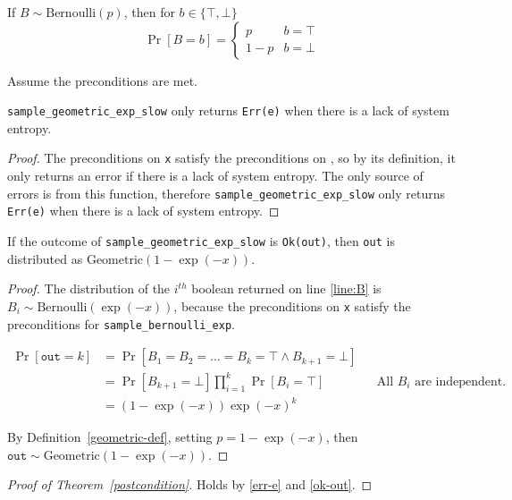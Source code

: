 \documentclass{article}
\begin{document}
\begin{definition}
    If $B \sim \mathrm{Bernoulli}(p)$, then for $b \in \{\top, \bot\}$
    \begin{equation}
        \Pr[B = b] =
        \begin{cases}
            p & b = \top \\
            1 - p & b = \bot
        \end{cases}
    \end{equation}
\end{definition}
Assume the preconditions are met.

\begin{lemma}\label{err-e}
    \texttt{sample\_geometric\_exp\_slow} only returns \texttt{Err(e)} when there is a lack of system entropy.
\end{lemma}

\begin{proof}
    The preconditions on \texttt{x} satisfy the preconditions on ,
    so by its definition, it only returns an error if there is a lack of system entropy.
    The only source of errors is from this function,
    therefore \texttt{sample\_geometric\_exp\_slow} only returns \texttt{Err(e)} when there is a lack of system entropy.
\end{proof}

\begin{theorem} \label{ok-out} \cite{CKS20}
    If the outcome of \texttt{sample\_geometric\_exp\_slow} is \texttt{Ok(out)},
    then \texttt{out} is distributed as $\mathrm{Geometric}(1 - \exp(-x))$.
\end{theorem}

\begin{proof}
    The distribution of the $i^{th}$ boolean returned on line \ref{line:B} is $B_i \sim \mathrm{Bernoulli}(\exp(-x))$,
    because the preconditions on \texttt{x} satisfy the preconditions for \texttt{sample\_bernoulli\_exp}.

    \begin{align*}
        \Pr[\texttt{out} = k] &= \Pr[B_1 = B_2 = ... = B_k = \top \land B_{k + 1} = \bot] \\
        &= \Pr[B_{k + 1} = \bot] \prod_{i=1}^{k} \Pr[B_i = \top] && \text{All $B_i$ are independent.} \\
        &= (1 - \exp(-x)) \exp(-x)^{k}
    \end{align*}

    By Definition~\ref{geometric-def}, setting $p = 1 - \exp(-x)$, then $\texttt{out} \sim \mathrm{Geometric}(1 - \exp(-x))$.
\end{proof}

\begin{proof}[Proof of Theorem~\ref{postcondition}]
    Holds by \ref{err-e} and \ref{ok-out}.
\end{proof}




\end{document}
